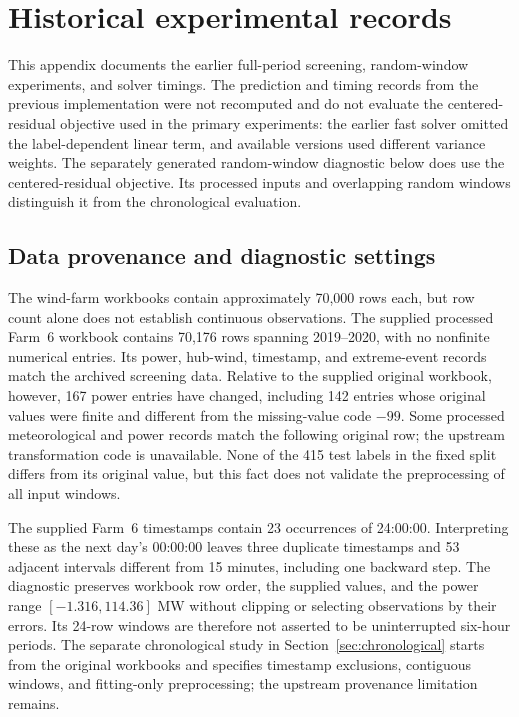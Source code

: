 \section{Historical experimental records}\label{app:legacy}

{\color{blue}This appendix documents the earlier full-period screening, random-window experiments, and solver timings. The prediction and timing records from the previous implementation were not recomputed and do not evaluate the centered-residual objective used in the primary experiments: the earlier fast solver omitted the label-dependent linear term, and available versions used different variance weights. The separately generated random-window diagnostic below does use the centered-residual objective. Its processed inputs and overlapping random windows distinguish it from the chronological evaluation.}

\subsection{Data provenance and diagnostic settings}\label{app:legacy_data}\label{app:legacy_setup}

{\color{blue}The wind-farm workbooks contain approximately 70{,}000 rows each, but row count alone does not establish continuous observations. The supplied processed Farm~6 workbook contains 70,176 rows spanning 2019--2020, with no nonfinite numerical entries. Its power, hub-wind, timestamp, and extreme-event records match the archived screening data. Relative to the supplied original workbook, however, 167 power entries have changed, including 142 entries whose original values were finite and different from the missing-value code $-99$. Some processed meteorological and power records match the following original row; the upstream transformation code is unavailable. None of the 415 test labels in the fixed split differs from its original value, but this fact does not validate the preprocessing of all input windows.}

{\color{blue}The supplied Farm~6 timestamps contain 23 occurrences of 24:00:00. Interpreting these as the next day's 00:00:00 leaves three duplicate timestamps and 53 adjacent intervals different from 15 minutes, including one backward step. The diagnostic preserves workbook row order, the supplied values, and the power range $[-1.316,114.36]$ MW without clipping or selecting observations by their errors. Its 24-row windows are therefore not asserted to be uninterrupted six-hour periods. The separate chronological study in Section~\ref{sec:chronological} starts from the original workbooks and specifies timestamp exclusions, contiguous windows, and fitting-only preprocessing; the upstream provenance limitation remains.}


